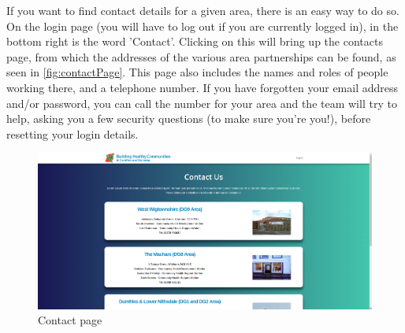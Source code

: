 \documentclass{bhcguides}
\begin{document}
If you want to find contact details for a given area, there is an easy way to do so. On the login page (you will have to log out if you are currently logged in), in the bottom right is the word 'Contact'. Clicking on this will bring up the contacts page, from which the addresses of the various area partnerships can be found, as seen in \autoref{fig:contactPage}. This page also includes the names and roles of people working there, and a telephone number. If you have forgotten your email address and/or password, you can call the number for your area and the team will try to help, asking you a few security questions (to make sure you're you!), before resetting your login details.

\begin{figure}[h]
 \centerline{\includegraphics[width=\textwidth, height=\textheight, keepaspectratio]{contactpage.png}}
 \caption{Contact page}
 \label{fig:contactPage}
\end{figure}
\end{document}
